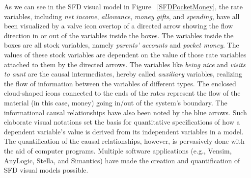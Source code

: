 \documentclass{sfuthesis}
\begin{document}
As we can see in the SFD visual model in Figure ~\ref{SFDPocketMoney}, the rate variables, including \textit{net income}, \textit{allowance}, \textit{money gifts}, and \textit{spending}, have all been visualized by a valve icon overtop of a directed arrow showing the flow direction in or out of the variables inside the boxes. The variables inside the boxes are all stock variables, namely \textit{parents’ accounts} and \textit{pocket money}. The values of these stock variables are dependent on the value of those rate variables attached to them by the directed arrows. The variables like \textit{being nice} and \textit{visits to aunt} are the causal intermediates, hereby called \textit{auxiliary} variables, realizing the flow of information between the variables of different types. The enclosed cloud-shaped icons connected to the ends of the rates represent the flow of the material (in this case, money) going in/out of the system’s boundary. The informational causal relationships have also been noted by the blue arrows. Such elaborate visual notations set the basis for quantitative specifications of how a dependent variable’s value is derived from its independent variables in a model. The quantification of the causal relationships, however, is pervasively done with the aid of computer programs. Multiple software applications (e.g., Vensim, AnyLogic, Stella, and Simantics) have made the creation and quantification of SFD visual models possible.\par
\end{document}
